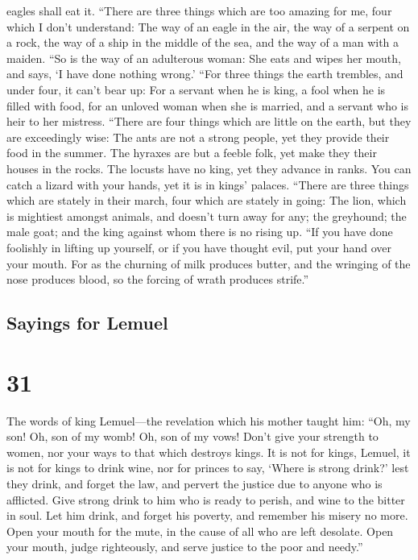 eagles shall eat it.  ``There are three things which are
too amazing for me, four which I don't understand:  The
way of an eagle in the air, the way of a serpent on a rock, the way of a
ship in the middle of the sea, and the way of a man with a maiden.
 ``So is the way of an adulterous woman: She eats and
wipes her mouth, and says, `I have done nothing wrong.' 
``For three things the earth trembles, and under four, it can't bear up:
 For a servant when he is king, a fool when he is filled
with food,  for an unloved woman when she is married, and
a servant who is heir to her mistress.  ``There are four
things which are little on the earth, but they are exceedingly wise:
 The ants are not a strong people, yet they provide their
food in the summer.  The hyraxes are but a feeble folk,
yet make they their houses in the rocks.  The locusts
have no king, yet they advance in ranks.  You can catch a
lizard with your hands, yet it is in kings' palaces. 
``There are three things which are stately in their march, four which
are stately in going:  The lion, which is mightiest
amongst animals, and doesn't turn away for any;  the
greyhound; the male goat; and the king against whom there is no rising
up.  ``If you have done foolishly in lifting up yourself,
or if you have thought evil, put your hand over your mouth.
 For as the churning of milk produces butter, and the
wringing of the nose produces blood, so the forcing of wrath produces
strife.''

\hypertarget{sayings-for-lemuel}{%
\subsection{Sayings for Lemuel}\label{sayings-for-lemuel}}

\hypertarget{section-30}{%
\section{31}\label{section-30}}

 The words of king Lemuel---the revelation which his
mother taught him:  ``Oh, my son! Oh, son of my womb! Oh,
son of my vows!  Don't give your strength to women, nor
your ways to that which destroys kings.  It is not for
kings, Lemuel, it is not for kings to drink wine, nor for princes to
say, `Where is strong drink?'  lest they drink, and forget
the law, and pervert the justice due to anyone who is afflicted.
 Give strong drink to him who is ready to perish, and wine
to the bitter in soul.  Let him drink, and forget his
poverty, and remember his misery no more.  Open your mouth
for the mute, in the cause of all who are left desolate. 
Open your mouth, judge righteously, and serve justice to the poor and
needy.''

